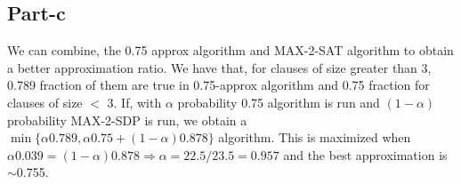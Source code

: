 \documentclass{article}
\begin{document}
\subsection*{Part-c}
We can combine, the 0.75 approx algorithm and MAX-2-SAT algorithm to obtain a better approximation ratio. We have that, for clauses of size greater than 3, 0.789 fraction of them are
true in 0.75-approx algorithm and 0.75 fraction for clauses of size $<$ 3. If,  with $\alpha$ probability 0.75 algorithm is run and $(1-\alpha)$ probability MAX-2-SDP is run, we obtain a $\min\{\alpha 0.789, \alpha 0.75 + (1 - \alpha)0.878\}$ algorithm. This is maximized when $\alpha 0.039 = (1 - \alpha)0.878 \Rightarrow \alpha = 22.5/23.5 = 0.957$ and the best approximation is $\sim$0.755.
\end{document}
